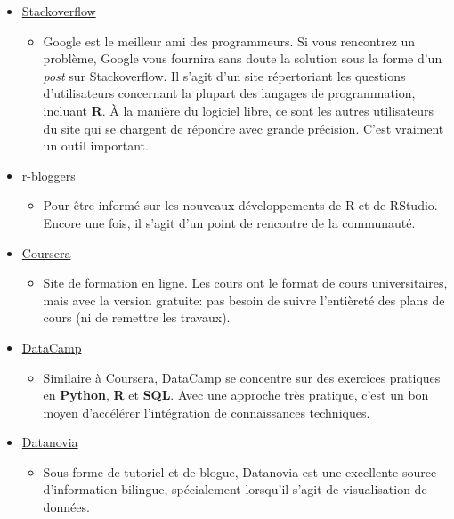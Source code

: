\documentclass[10.5pt,a4paper]{article}
\begin{document}
\begin{itemize}
  \item \href{https://stackoverflow.com}{Stackoverflow}
    \begin{itemize}
      \item Google est le meilleur ami des programmeurs. Si vous rencontrez un problème, Google vous fournira sans doute la solution sous la forme d'un \textit{post} sur Stackoverflow. Il s'agit d'un site répertoriant les questions d'utilisateurs concernant la plupart des langages de programmation, incluant \textbf{R}. À la manière du logiciel libre, ce sont les autres utilisateurs du site qui se chargent de répondre avec grande précision. C'est vraiment un outil important. 
    \end{itemize}
  \item \href{https://www.r-bloggers.com}{r-bloggers}
    \begin{itemize}
      \item Pour être informé sur les nouveaux développements de R et de RStudio. Encore une fois, il s'agit d'un point de rencontre de la communauté.
    \end{itemize}
  \item \href{https://www.coursera.org}{Coursera}
    \begin{itemize}
      \item Site de formation en ligne. Les cours ont le format de cours universitaires, mais avec la version gratuite: pas besoin de suivre l’entièreté des plans de cours (ni de remettre les travaux).
    \end{itemize}
  \item \href{https://www.datacamp.com}{DataCamp}
    \begin{itemize}
      \item Similaire à Coursera, DataCamp se concentre sur des exercices pratiques en \textbf{Python}, \textbf{R} et \textbf{SQL}. Avec une approche très pratique, c'est un bon moyen d'accélérer l'intégration de connaissances techniques. 
    \end{itemize}
\item \href{https://www.datanovia.com/en/}{Datanovia}
    \begin{itemize}
      \item Sous forme de tutoriel et de blogue, Datanovia est une excellente source d'information bilingue, spécialement lorsqu'il s'agit de visualisation de données.
    \end{itemize}
\end{itemize}
\end{document}
